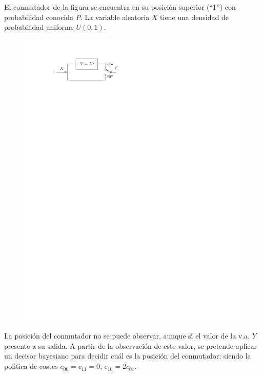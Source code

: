 \ifspanish

\question El conmutador de la figura se encuentra en su posici\'{o}n superior (``1'') con probabilidad conocida $P$. La variable aleatoria $X$ tiene una densidad de probabilidad uniforme $U(0,1)$. 
\begin{figure}[h]
\begin{center}
\includegraphics[width=12cm, trim=0cm 24cm 9cm 2cm]{Figuras/conmutador}
\end{center}
\end{figure}

\vspace{-0.2cm} La posici\'{o}n del conmutador no se puede observar, aunque s\'{\i} el valor de la v.a. $Y$ presente a su salida. A partir de la observaci\'{o}n de este valor, se pretende aplicar un decisor bayesiano
para decidir cu\'{a}l es la posici\'{o}n del conmutador: siendo la pol\'{\i}tica de costes $c_{00}=c_{11}=0$,
$c_{10}=2c_{01}$.
 
